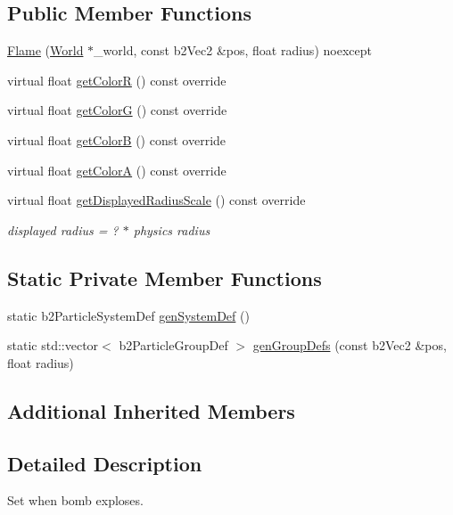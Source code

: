 \subsection*{Public Member Functions}
\begin{DoxyCompactItemize}
\item 
\hyperlink{classFlame_af76751e5a5bc652873134f5f21995ea1}{Flame} (\hyperlink{classWorld}{World} $\ast$\+\_\+world, const b2\+Vec2 \&pos, float radius) noexcept
\item 
virtual float \hyperlink{classFlame_a3cdb607d9cadaeb164494ea2334c4bf8}{get\+Color\+R} () const override
\item 
virtual float \hyperlink{classFlame_a52151a48e25d77440ea47b3479501d36}{get\+Color\+G} () const override
\item 
virtual float \hyperlink{classFlame_abbd9b48e0a3744f4a9c59df52e8c8ca1}{get\+Color\+B} () const override
\item 
virtual float \hyperlink{classFlame_a9730bb5ff22bdf2ab579eb9ae1d8a37f}{get\+Color\+A} () const override
\item 
virtual float \hyperlink{classFlame_a472dc6269e6e13b4628abd2392726fd8}{get\+Displayed\+Radius\+Scale} () const override
\begin{DoxyCompactList}\small\item\em displayed radius = ? $\ast$ physics radius \end{DoxyCompactList}\end{DoxyCompactItemize}
\subsection*{Static Private Member Functions}
\begin{DoxyCompactItemize}
\item 
static b2\+Particle\+System\+Def \hyperlink{classFlame_a506fab6b9538a0f0caaa6a7ad41b1eda}{gen\+System\+Def} ()
\item 
static std\+::vector$<$ b2\+Particle\+Group\+Def $>$ \hyperlink{classFlame_aebd27d59d485bd8138d2fc33528d2406}{gen\+Group\+Defs} (const b2\+Vec2 \&pos, float radius)
\end{DoxyCompactItemize}
\subsection*{Additional Inherited Members}


\subsection{Detailed Description}
Set when bomb exploses. 


